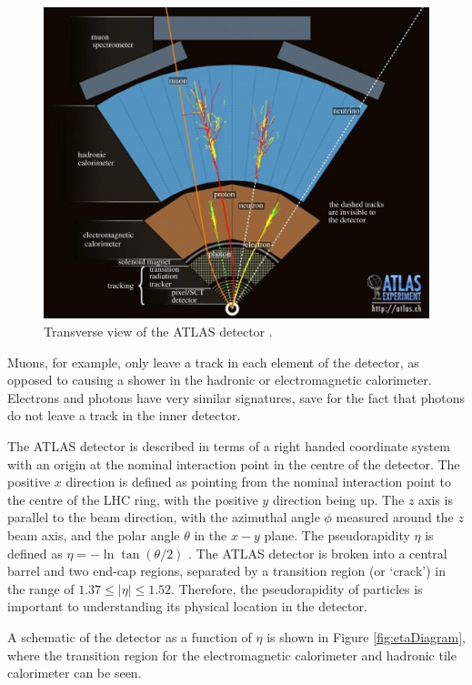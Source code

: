 \documentclass{article}
\begin{document}
\begin{figure}[h]
    \centering
    \includegraphics[scale=0.23]{images/DetectorCrossSection.jpg}
    \caption{ Transverse view of the ATLAS detector \cite{PhysicsRequirementsATLAS}. \label{fig:DetectorCrossSection} }
\end{figure}
Muons, for example, only leave a track in each element of the detector, as opposed to causing a shower in the hadronic or electromagnetic calorimeter. Electrons and photons have very similar signatures, save for the fact that photons do not leave a track in the inner detector. 


The ATLAS detector is described in terms of a right handed coordinate system with an origin at the nominal interaction point in the centre of the detector. The positive $x$ direction is defined as pointing from the nominal interaction point to the centre of the LHC ring, with the positive $y$ direction being up. The $z$ axis is parallel to the beam direction, with the azimuthal angle $\phi$ measured around the $z$ beam axis, and the polar angle $\theta$ in the $x-y$ plane. The pseudorapidity $\eta$ is defined as $\eta = -\ln\tan(\theta/2)$ \cite{ATLASReview}.
The ATLAS detector is broken into a central barrel and two end-cap regions, separated by a transition region (or `crack') in the range of $1.37\leq|\eta|\leq1.52$. 
Therefore, the pseudorapidity of particles is important to understanding its physical location in the detector.

A schematic of the detector as a function of $\eta$ is shown in Figure \ref{fig:etaDiagram}, where the transition region for the electromagnetic calorimeter and hadronic tile calorimeter can be seen.
\end{document}
